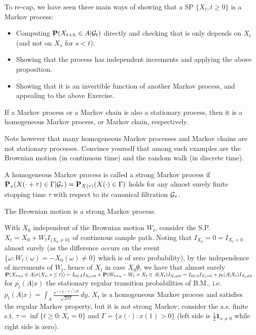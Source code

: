 \begin{remark*} 
To re-cap, we have seen three main ways of showing that a SP $\{X_t, t \ge
0\}$ is a Markov process:
\begin{itemize}
\item Computing $\mathbf{P}(X_{t+h} \in A | \mathcal{G}_t)$ directly and checking that is only
depends on $X_t$ (and not on $X_s$ for $s < t$).

\item Showing that the process has independent increments and applying
the above proposition.

\item Showing that it is an invertible function of another Markov process, and
appealing to the above Exercise.
\end{itemize}
\end{remark*} 

\begin{proposition*} 
If a Markov process or a Markov chain is also a stationary process, then it is a
homogeneous Markov process, or Markov chain, respectively.
\end{proposition*} 

\begin{remark*} 
Note however that many homogeneous Markov processes and Markov chains are not
stationary processes. Convince yourself that among such examples are the
Brownian motion (in continuous time) and the random walk (in discrete time).
\end{remark*} 

\begin{definition*} 
A homogeneous Markov process is called a strong Markov process if
$\mathbf{P}_x(X(\cdot + \tau) \in \Gamma | \mathcal{G}_\tau) = \mathbf{P}_{X(\tau)} (X(\cdot)
\in \Gamma)$ holds for any almost surely finite stopping time $\tau$ with
respect to its canonical filtration $\mathcal{G}_\tau$.
\end{definition*} 

\begin{corollary*} 
The Brownian motion is a strong Markov process.
\end{corollary*} 

\begin{example*}
With $X_0$ independent of the Brownian motion $W_t$, consider the S.P. $X_t = X_0 + W_t I_{\{X_0 \not = 0\}}$ of continuous sample path. Noting that $I_{X_0}=0=I_{X_t=0}$ almost surely (as the difference occurs on the event $\{\omega : W_t(\omega) = -X_0(\omega)\not=0\}$ which is of zero probability), by the independence of increments of $W_t$, hence of $X_t$ in case $X_0 \not 0$, we have that almost surely $\mathbf{P}(X_{t+u} \in A|\sigma(X_s,s\leq t)) = I_{0\in A}I_{X_0=0} + \mathbf{P}(W_{t+u} - W_t + X_t \in A|X_t)I_{X_0\not=0} = I_{0\in A} I_{X_t=0} + p_t(A|X_t)I_{X_t\not=0}$ for $p_t(A|x)$ the stationary regular transition probabilities of B.M., i.e. $p_t(A|x) = \int_A \frac{e^{-(y-x)^2/2t}}{\sqrt{2\pi t}} \, dy$. $X_t$ is a homogeneous Markov process and satisfies the regular Markov property, but it is not strong Markov; consider the a.s. finite s.t. $\tau=\inf\{t\geq0 : X_t=0\}$ and $\Gamma=\{x(\cdot) : x(1) > 0\}$ (left side is $\frac12 \mathbf 1_{x\not=0}$ while right side is zero).
\end{example*}

